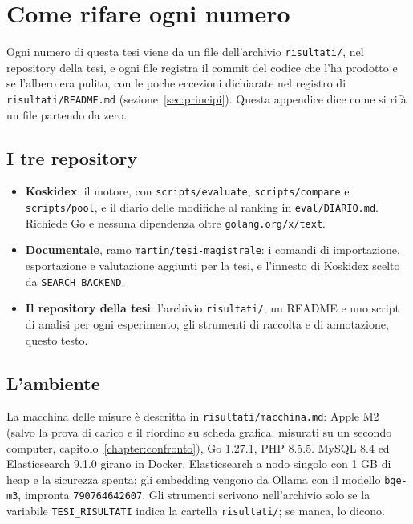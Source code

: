 \chapter{Come rifare ogni numero}\label{chapter:appendice-riproducibilita}
\sloppy

Ogni numero di questa tesi viene da un file dell'archivio \texttt{risultati/}, nel
repository della tesi, e ogni file registra il commit del codice che l'ha prodotto
e se l'albero era pulito, con le poche eccezioni dichiarate nel registro di
\texttt{risultati/README.md} (sezione~\ref{sec:principi}). Questa appendice dice come
si rifà un file partendo da zero.

\section*{I tre repository}

\begin{itemize}
  \item \textbf{Koskidex}: il motore, con \texttt{scripts/evaluate},
        \texttt{scripts/compare} e \texttt{scripts/pool}, e il diario delle
        modifiche al ranking in \texttt{eval/DIARIO.md}. Richiede Go e nessuna
        dipendenza oltre \texttt{golang.org/x/text}.
  \item \textbf{Documentale}, ramo \texttt{martin/tesi-magistrale}: i comandi di
        importazione, esportazione e valutazione aggiunti per la tesi, e
        l'innesto di Koskidex scelto da \texttt{SEARCH\_BACKEND}.
  \item \textbf{Il repository della tesi}: l'archivio \texttt{risultati/}, un
        README e uno script di analisi per ogni esperimento, gli strumenti di
        raccolta e di annotazione, questo testo.
\end{itemize}

\section*{L'ambiente}

La macchina delle misure è descritta in \texttt{risultati/macchina.md}: Apple M2
(salvo la prova di carico e il riordino su scheda grafica, misurati su un secondo
computer, capitolo~\ref{chapter:confronto}), Go 1.27.1, PHP 8.5.5. MySQL 8.4 ed Elasticsearch 9.1.0 girano in Docker,
Elasticsearch a nodo singolo con 1 GB di heap e la sicurezza spenta; gli embedding
vengono da Ollama con il modello \texttt{bge-m3}, impronta \texttt{790764642607}.
Gli strumenti scrivono nell'archivio solo se la variabile \texttt{TESI\_RISULTATI}
indica la cartella \texttt{risultati/}; se manca, lo dicono.

